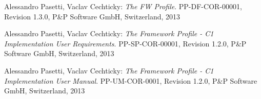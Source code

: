 \documentclass[a4paper,10pt]{article}
\begin{document}
\newpage

\begin{thebibliography}{6}

 Alessandro Pasetti, Vaclav Cechticky:
           {\sl The FW Profile}. PP-DF-COR-00001, Revision 1.3.0,
           P\&P Software GmbH, Switzerland, 2013

 Alessandro Pasetti, Vaclav Cechticky:
           {\sl The Framework Profile - C1 Implementation User Requirements}. PP-SP-COR-00001, Revision 1.2.0,
           P\&P Software GmbH, Switzerland, 2013

 Alessandro Pasetti, Vaclav Cechticky:
            {\sl The Framework Profile - C1 Implementation User Manual}. PP-UM-COR-0001, Revision 1.2.0,
            P\&P Software GmbH, Switzerland, 2013   


\end{thebibliography}
\end{document}
